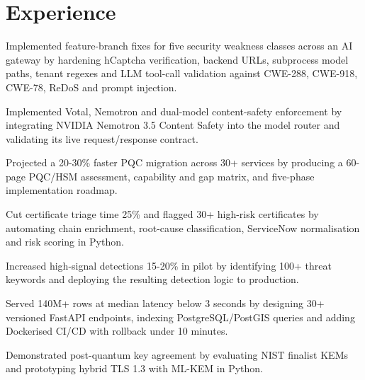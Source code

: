 \vfill
\section{Experience}

\begin{resumeBullets}
  \item Implemented feature-branch fixes for five security weakness classes across an AI gateway by hardening hCaptcha verification, backend URLs, subprocess model paths, tenant regexes and LLM tool-call validation against CWE-288, CWE-918, CWE-78, ReDoS and prompt injection.
  \item Implemented Votal, Nemotron and dual-model content-safety enforcement by integrating NVIDIA Nemotron 3.5 Content Safety into the model router and validating its live request/response contract.
\end{resumeBullets}

\begin{resumeBullets}
  \item Projected a 20-30\% faster PQC migration across 30+ services by producing a 60-page PQC/HSM assessment, capability and gap matrix, and five-phase implementation roadmap.
  \item Cut certificate triage time 25\% and flagged 30+ high-risk certificates by automating chain enrichment, root-cause classification, ServiceNow normalisation and risk scoring in Python.
  \item Increased high-signal detections 15-20\% in pilot by identifying 100+ threat keywords and deploying the resulting detection logic to production.
\end{resumeBullets}

\begin{resumeBullets}
  \item Served 140M+ rows at median latency below 3 seconds by designing 30+ versioned FastAPI endpoints, indexing \mbox{PostgreSQL}/\mbox{PostGIS} queries and adding Dockerised CI/CD with rollback under 10 minutes.
\end{resumeBullets}

\begin{resumeBullets}
  \item Demonstrated post-quantum key agreement by evaluating NIST finalist KEMs and prototyping hybrid TLS 1.3 with ML-KEM in Python.
\end{resumeBullets}

